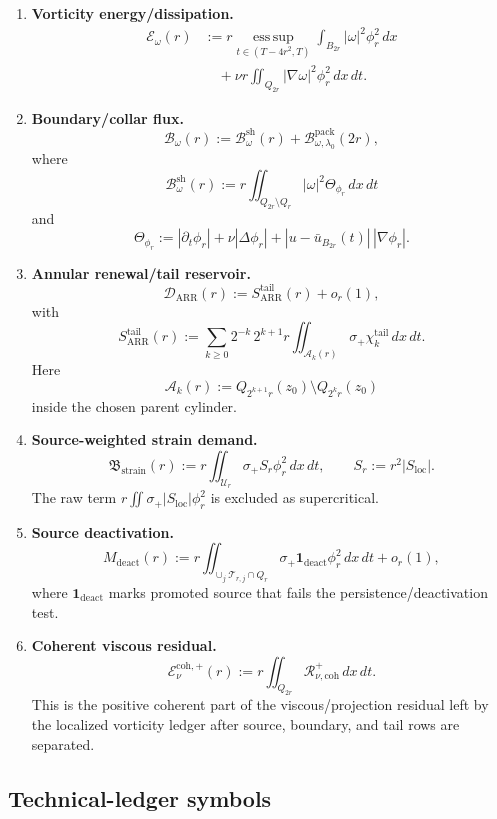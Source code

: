 \documentclass[11pt]{article}
\begin{document}
\begin{enumerate}
\item \textbf{Vorticity energy/dissipation.}
\[
\begin{aligned}
\mathcal E_\omega(r)
&:= r\operatorname*{ess\,sup}_{t\in(T-4r^2,T)}
      \int_{B_{2r}}|\omega|^2\phi_r^2\,dx \\
&\quad+\nu r\iint_{Q_{2r}}|\nabla\omega|^2\phi_r^2\,dx\,dt .
\end{aligned}
\]

\item \textbf{Boundary/collar flux.}
\[
\mathcal B_\omega(r)
:=\mathcal B_\omega^{\mathrm{sh}}(r)
  +\mathcal B_{\omega,\lambda_0}^{\mathrm{pack}}(2r),
\]
where
\[
\mathcal B_\omega^{\mathrm{sh}}(r)
:=r\iint_{Q_{2r}\setminus Q_r}
|\omega|^2\Theta_{\phi_r}\,dx\,dt
\]
and
\[
\Theta_{\phi_r}
:=|\partial_t\phi_r|+\nu|\Delta\phi_r|
  +|u-\bar u_{B_{2r}}(t)|\,|\nabla\phi_r|.
\]

\item \textbf{Annular renewal/tail reservoir.}
\[
\mathcal D_{\mathrm{ARR}}(r)
:=S_{\mathrm{ARR}}^{\mathrm{tail}}(r)+o_r(1),
\]
with
\[
S_{\mathrm{ARR}}^{\mathrm{tail}}(r)
:=\sum_{k\ge0}2^{-k}\,2^{k+1}r
\iint_{\mathcal A_k(r)}
\sigma_+\chi_k^{\mathrm{tail}}\,dx\,dt .
\]
Here
\[
\mathcal A_k(r)
:=Q_{2^{k+1}r}(z_0)\setminus Q_{2^kr}(z_0)
\]
inside the chosen parent cylinder.

\item \textbf{Source-weighted strain demand.}
\[
\mathfrak B_{\mathrm{strain}}(r)
:=r\iint_{\mathcal U_r}\sigma_+S_r\phi_r^2\,dx\,dt,
\qquad
S_r:=r^2|S_{\mathrm{loc}}|.
\]
The raw term \(r\iint\sigma_+|S_{\mathrm{loc}}|\phi_r^2\) is excluded as
supercritical.

\item \textbf{Source deactivation.}
\[
M_{\mathrm{deact}}(r)
:=r\iint_{\cup_j\mathcal T_{r,j}\cap Q_r}
\sigma_+\mathbf 1_{\mathrm{deact}}\phi_r^2\,dx\,dt+o_r(1),
\]
where \(\mathbf 1_{\mathrm{deact}}\) marks promoted source that fails the
persistence/deactivation test.

\item \textbf{Coherent viscous residual.}
\[
\mathcal E_\nu^{\mathrm{coh},+}(r)
:=r\iint_{Q_{2r}}\mathcal R_{\nu,\mathrm{coh}}^+\,dx\,dt.
\]
This is the positive coherent part of the viscous/projection residual left by
the localized vorticity ledger after source, boundary, and tail rows are
separated.
\end{enumerate}

\subsection*{Technical-ledger symbols}
\end{document}
